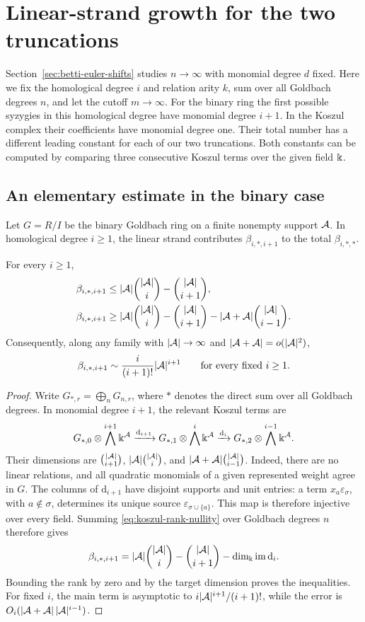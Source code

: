 \section{Linear-strand growth for the two truncations}
\label{sec:growth}

Section~\ref{sec:betti-euler-shifts} studies $n\to\infty$ with monomial
degree $d$ fixed. Here we fix the homological degree $i$ and relation
arity $k$, sum over all Goldbach degrees $n$, and let the cutoff
$m\to\infty$.
For the binary ring the first possible syzygies in this homological degree
have monomial degree $i+1$. In the Koszul complex their coefficients
have monomial degree one. Their total number has a different leading constant for
each of our two truncations. Both constants can be computed by comparing
three consecutive Koszul terms over the given field $\Bbbk$.

\subsection{An elementary estimate in the binary case}

Let $G=R/I$ be the binary Goldbach ring on a finite nonempty support
$\mathcal A$. In homological degree $i\ge1$, the linear strand contributes
$\beta_{i,*,i+1}$ to the total $\beta_{i,*,*}$.

\begin{proposition}\label{grow:binary-bound}
For every $i\ge1$,
\[
 \begin{aligned}
 \beta_{i,*,i+1}
 &\le |\mathcal A|\binom{|\mathcal A|}{i}-\binom{|\mathcal A|}{i+1},\\
 \beta_{i,*,i+1}
 &\ge |\mathcal A|\binom{|\mathcal A|}{i}-\binom{|\mathcal A|}{i+1}
       -|\mathcal A+\mathcal A|\binom{|\mathcal A|}{i-1}.
 \end{aligned}
\]
Consequently, along any family with $|\mathcal A|\to\infty$ and $|\mathcal A+\mathcal A|=o(|\mathcal A|^2)$,
\[
 \beta_{i,*,i+1}\sim\frac{i}{(i+1)!}|\mathcal A|^{i+1}
 \qquad\text{for every fixed }i\ge1.
\]
\end{proposition}
\begin{proof}
Write $G_{*,r}=\bigoplus_n G_{n,r}$, where $*$ denotes the direct sum
over all Goldbach degrees. In monomial degree $i+1$, the relevant
Koszul terms are
\[
 G_{*,0}\otimes\bigwedge^{i+1}\Bbbk^{\mathcal A}
 \xrightarrow{\mathrm{d}_{i+1}}
 G_{*,1}\otimes\bigwedge^i\Bbbk^{\mathcal A}
 \xrightarrow{\mathrm{d}_i}
 G_{*,2}\otimes\bigwedge^{i-1}\Bbbk^{\mathcal A}.
\]
Their dimensions are $\binom{|\mathcal A|}{i+1}$, $|\mathcal A|\binom{|\mathcal A|}{i}$, and
$|\mathcal A+\mathcal A|\binom{|\mathcal A|}{i-1}$. Indeed, there are no linear relations, and
all quadratic monomials of a given represented weight agree in $G$.
The columns of $\mathrm{d}_{i+1}$ have disjoint supports and unit entries:
a term $x_a\varepsilon_{\sigma}$, with $a\notin \sigma$, determines its unique
source $\varepsilon_{\sigma\cup\{a\}}$. This map is therefore injective
over every field. Summing \eqref{eq:koszul-rank-nullity} over Goldbach
degrees $n$ therefore gives
\[
 \beta_{i,*,i+1}
 =|\mathcal A|\binom{|\mathcal A|}{i}-\binom{|\mathcal A|}{i+1}
   -\dim_\Bbbk\operatorname{im}\mathrm{d}_i.
\]
Bounding the rank by zero and by the target dimension proves the
inequalities. For fixed $i$, the main term is asymptotic to
$i|\mathcal A|^{i+1}/(i+1)!$, while the error is $O_i(|\mathcal A+\mathcal A|\,|\mathcal A|^{i-1})$.
\end{proof}

